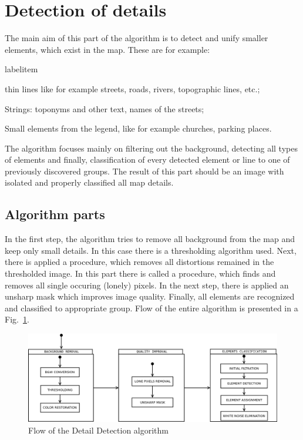 \documentclass[a4paper,onecolumn,oneside,12pt]{memoir}
\makeatletter
\renewenvironment{itemize}{
  \begin{list}{  
  \csname labelitem\romannumeral\the\@listdepth\endcsname}{
  \setlength{\leftmargin}{1em}
	\setlength{\topsep}{6pt}%
	\setlength{\partopsep}{0pt}%
	\setlength{\parskip}{0pt}%
	\setlength{\parsep}{0pt}%
	\setlength{\itemsep}{0pt}}
}{
  \end{list}
}
\makeatother
\begin{document}
\section{Detection of details}

The main aim of this part of the algorithm is to detect and unify smaller elements, which exist in
the map. These are for example:
\begin{itemize}
  \item thin lines like for example streets, roads, rivers, topographic lines, etc.;
  \item Strings: toponyms and other text, names of the streets;
  \item Small elements from the legend, like for example churches, parking places.
\end{itemize}

The algorithm focuses mainly on filtering out the background, detecting all types of elements and
finally, classification of every detected element or line to one of previously discovered groups.
The result of this part should be an image with isolated and properly classified all map details.

\subsection{Algorithm parts}

In the first step, the algorithm tries to remove all background from the map and keep only small
details. In this case there is a thresholding algorithm used. Next, there is applied a procedure,
which removes all distortions remained in the thresholded image. In this part there is called a 
procedure, which finds and removes all single occuring (lonely) pixels. In the next step, there is
applied an unsharp mask which improves image quality. Finally, all elements are recognized and 
classified to appropriate group. Flow of the entire algorithm is presented in a 
Fig.~\ref{detailDetectionFlow}.

\begin{figure}[!ht]
\begin{center}
\includegraphics[scale=0.4]{images/detailDetectionFlow.png}
\caption{Flow of the Detail Detection algorithm}
\label{detailDetectionFlow}
\end{center}
\end{figure}
\end{document}
